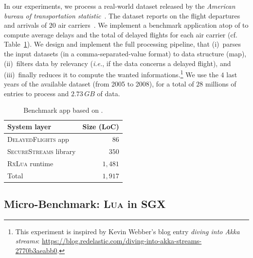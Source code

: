 In our experiments, we process a real-world dataset released by the \emph{American bureau of transportation statistic}~\cite{rita:bts}.
The dataset reports on the flight departures and arrivals of $20$ air carriers~\cite{statistical_computing:data}.
We implement a benchmark application atop of \SYS{} to compute average delays and the total of delayed flights for each air carrier (cf. Table~\ref{tab:appsize}).
We design and implement the full processing pipeline, that (i)~parses the input datasets (in a comma-separated-value format) to data structure (\textsf{map}), (ii)~filters data by relevancy (\emph{i.e.}, if the data concerns a delayed flight), and (iii)~finally reduces it to compute the wanted informations.\footnote{This experiment is inspired by Kevin Webber's blog entry \emph{diving into Akka streams}: \url{https://blog.redelastic.com/diving-into-akka-streams-2770b3aeabb0}.}
We use the $4$ last years of the available dataset (from 2005 to 2008), for a total of $28$ millions of entries to process and $2.73\,GB$ of data.


\begin{table}[t!]
    \centering
    \begin{tabular}{l|r}
\textbf{System layer}          & \textbf{Size (LoC)} \\
\hline
\textsc{DelayedFlights} app    & $86$ \\
\textsc{SecureStreams} library & $350$ \\
\textsc{RxLua} runtime         & $1,481$ \\
\hline
\hline
Total                          & $1,917$ \\
    \end{tabular}
    \caption{Benchmark app based on \SYS{}.}
  \label{tab:appsize}
\end{table}

\subsection{Micro-Benchmark: \textsc{Lua} in SGX}

